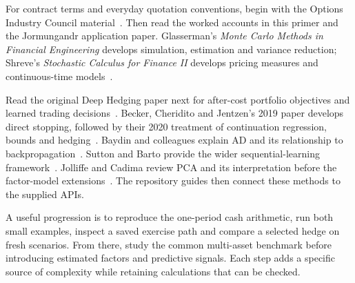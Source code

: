 \documentclass[8pt]{strategynet-journal}
\begin{document}
\begin{SNcolumns}
For contract terms and everyday quotation conventions, begin with the Options
Industry Council material~\cite{oicpricing,oicexercise}. Then read the worked
accounts in this primer and the Jormungandr application paper. Glasserman's
\emph{Monte Carlo Methods in Financial Engineering} develops simulation,
estimation and variance reduction; Shreve's \emph{Stochastic Calculus for
Finance II} develops pricing measures and continuous-time models~\cite{glasserman,shreve}.

Read the original Deep Hedging paper next for after-cost portfolio objectives
and learned trading decisions~\cite{deephedging}. Becker, Cheridito and Jentzen's
2019 paper develops direct stopping, followed by their 2020 treatment of
continuation regression, bounds and hedging~\cite{stopping,american}. Baydin
and colleagues explain AD and its relationship to backpropagation~\cite{ad}.
Sutton and Barto provide the wider sequential-learning framework~\cite{sutton}.
Jolliffe and Cadima review PCA and its interpretation before the factor-model
extensions~\cite{pca}. The repository guides then connect these methods to the
supplied APIs.

A useful progression is to reproduce the one-period cash arithmetic, run both
small examples, inspect a saved exercise path and compare a selected hedge
on fresh scenarios. From there, study the common multi-asset benchmark before
introducing estimated factors and predictive signals. Each step adds a
specific source of complexity while retaining calculations that can be checked.
\end{SNcolumns}
\clearpage
\end{document}
